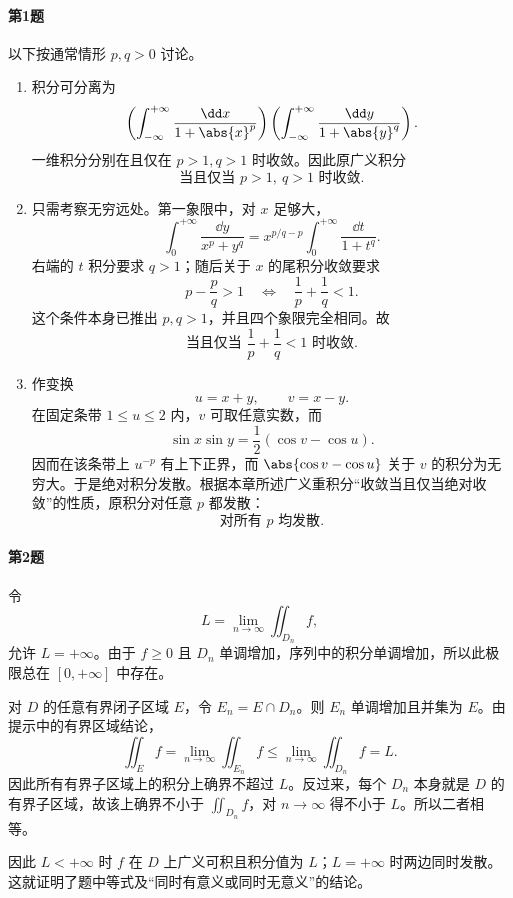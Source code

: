 \paragraph{第1题}
\begin{xsolution}
以下按通常情形 $p,q>0$ 讨论。
\begin{enumerate}[label=(\arabic*)]
  \item 积分可分离为
  \[
   \left(\int_{-\infty}^{+\infty}\frac{\dd x}{1+\abs{x}^p}\right)
   \left(\int_{-\infty}^{+\infty}\frac{\dd y}{1+\abs{y}^q}\right).
  \]
  一维积分分别在且仅在 $p>1,q>1$ 时收敛。因此原广义积分
  \[
    \boxed{\text{当且仅当 }p>1,\ q>1\text{ 时收敛}}.
  \]

  \item 只需考察无穷远处。第一象限中，对 $x$ 足够大，
  \[
   \int_0^{+\infty}\frac{\dd y}{x^p+y^q}
   =x^{p/q-p}\int_0^{+\infty}\frac{\dd t}{1+t^q}.
  \]
  右端的 $t$ 积分要求 $q>1$；随后关于 $x$ 的尾积分收敛要求
  \[
    p-\frac pq>1
    \quad\Longleftrightarrow\quad
    \frac1p+\frac1q<1.
  \]
  这个条件本身已推出 $p,q>1$，并且四个象限完全相同。故
  \[
    \boxed{\text{当且仅当 }\frac1p+\frac1q<1\text{ 时收敛}}.
  \]

  \item 作变换
  \[
    u=x+y,
    \qquad v=x-y.
  \]
  在固定条带 $1\le u\le2$ 内，$v$ 可取任意实数，而
  \[
   \sin x\sin y
   =\frac12\left(\cos v-\cos u\right).
  \]
  因而在该条带上 $u^{-p}$ 有上下正界，而 $\abs{\cos v-\cos u}$ 关于 $v$ 的积分为无穷大。于是绝对积分发散。根据本章所述广义重积分“收敛当且仅当绝对收敛”的性质，原积分对任意 $p$ 都发散：
  \[
    \boxed{\text{对所有 }p\text{ 均发散}}.
  \]
\end{enumerate}
\end{xsolution}

\paragraph{第2题}
\begin{xsolution}
令
\[
 L=\lim_{n\to\infty}\iint_{D_n}f,
\]
允许 $L=+\infty$。由于 $f\ge0$ 且 $D_n$ 单调增加，序列中的积分单调增加，所以此极限总在 $[0,+\infty]$ 中存在。

对 $D$ 的任意有界闭子区域 $E$，令 $E_n=E\cap D_n$。则 $E_n$ 单调增加且并集为 $E$。由提示中的有界区域结论，
\[
 \iint_Ef=\lim_{n\to\infty}\iint_{E_n}f
 \le\lim_{n\to\infty}\iint_{D_n}f=L.
\]
因此所有有界子区域上的积分上确界不超过 $L$。反过来，每个 $D_n$ 本身就是 $D$ 的有界子区域，故该上确界不小于 $\iint_{D_n}f$，对 $n\to\infty$ 得不小于 $L$。所以二者相等。

因此 $L<+\infty$ 时 $f$ 在 $D$ 上广义可积且积分值为 $L$；$L=+\infty$ 时两边同时发散。这就证明了题中等式及“同时有意义或同时无意义”的结论。
\end{xsolution}

